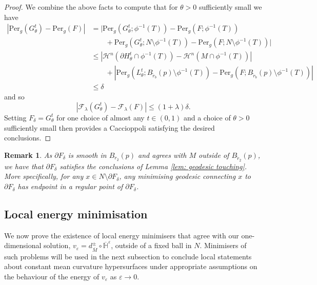 \documentclass[11pt]{article}
\newtheorem{rem}{Remark}
\begin{document}
\begin{proof}
We combine the above facts to compute that for $\theta > 0$ sufficiently small we have
\begin{align*}
    |\mathrm{Per}_g(G^t_\theta) - \mathrm{Per}_g(F)| &= |\mathrm{Per}_g(G^t_\theta;\phi^{-1}(T)) - \mathrm{Per}_g(F;\phi^{-1}(T)) \\
    &\quad\quad+ \mathrm{Per}_g(G^t_\theta;N \setminus \phi^{-1}(T)) - \mathrm{Per}_g(F;N \setminus \phi^{-1}(T))|\\
    &\leq |\mathcal{H}^n(\partial H^t_\theta \cap \phi^{-1}(T)) - \mathcal{H}^n(M \cap \phi^{-1}(T))|\\
    &\quad\quad+ |\mathrm{Per}_g(L^t_\theta;B_{\tilde{r}_b}(p) \setminus \phi^{-1}(T)) - \mathrm{Per}_g(F;B_{\tilde{r}_b}(p) \setminus \phi^{-1}(T))|\\
    &\leq \delta
\end{align*}
and so
\begin{equation*}
    |\mathcal{F}_\lambda(G_\theta^t) - \mathcal{F}_\lambda(F)| 
    \leq (1 + \lambda)\delta.
\end{equation*}
Setting $F_\delta = G^t_\theta$ for one choice of almost any $t \in (0,1)$ and a choice of $\theta > 0$ sufficiently small then provides a Caccioppoli satisfying the desired conclusions.
\end{proof}


\begin{rem}\label{rem: local smoothings satisfy geodesic touching lemma}
As $\partial F_\delta$ is smooth in $B_{r_2}(p)$ and agrees with $M$ outside of $B_{\tilde{r}_2}(p)$, we have that $\partial F_\delta$ satisfies the conclusions of Lemma \ref{lem: geodesic touching}. More specifically, for any $x \in N \setminus \partial F_\delta$, any minimising geodesic connecting $x$ to $\partial F_\delta$ has endpoint in a regular point of $\partial F_\delta$.
\end{rem}

\subsection{Local energy minimisation}\label{subsec: function minimisation}

We now prove the existence of local energy minimisers that agree with our one-dimensional solution, $v_\varepsilon= d^\pm_{\overline{M}} \circ \overline{\mathbb{H}}^\varepsilon$, outside of a fixed ball in $N$. Minimisers of such problems will be used in the next subsection to conclude local statements about constant mean curvature hypersurfaces under appropriate assumptions on the behaviour of the energy of $v_\varepsilon$ as $\varepsilon \rightarrow 0$.
\end{document}
